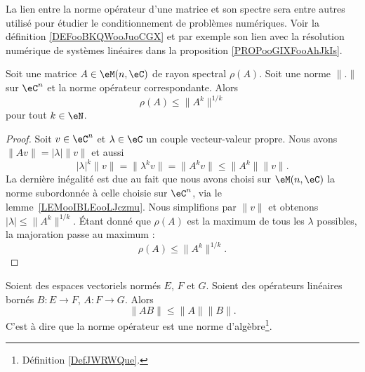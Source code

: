 La lien entre la norme opérateur d'une matrice et son spectre sera entre autres utilisé pour étudier le conditionnement de problèmes numériques. Voir la définition \ref{DEFooBKQWooJuoCGX} et par exemple son lien avec la résolution numérique de systèmes linéaires dans la proposition \ref{PROPooGIXFooAhJkIs}.

\begin{proposition}      \label{PROPooKLFKooSVnDzr}
    Soit une matrice \( A\in \eM(n,\eC)\) de rayon spectral \( \rho(A)\). Soit une norme \( \| . \|\) sur \( \eC^n\) et la norme opérateur correspondante. Alors
    \begin{equation}
        \rho(A)\leq \| A^k \|^{1/k}
    \end{equation}
    pour tout \( k\in \eN\).
\end{proposition}

\begin{proof}
    Soit \( v\in \eC^n\) et \( \lambda\in \eC\) un couple vecteur-valeur propre. Nous avons \( \| Av \|=| \lambda |\| v \|\) et aussi
    \begin{equation}
        | \lambda |^k\| v \|=\| \lambda^kv \|=\| A^kv \|\leq \| A^k \|\| v \|.
    \end{equation}
    La dernière inégalité est due au fait que nous avons choisi sur \( \eM(n,\eC)\) la norme subordonnée à celle choisie sur \( \eC^n\), via le lemme~\ref{LEMooIBLEooLJczmu}. Nous simplifions par \( \| v \|\) et obtenons \( | \lambda |\leq \| A^k \|^{1/k}\). Étant donné que \( \rho(A)\) est la maximum de tous les \( \lambda\) possibles, la majoration passe au maximum :
    \begin{equation}
        \rho(A)\leq \| A^k \|^{1/k}.
    \end{equation}
\end{proof}

\begin{lemma}   \label{LEMooFITMooBBBWGI}
    Soient des espaces vectoriels normés \( E\), \( F\) et \( G\). Soient des opérateurs linéaires bornés \( B\colon E\to F\), \( A\colon F\to G\). Alors
    \begin{equation}
        \| AB \|\leq \| A \|\| B \|.
    \end{equation}
    C'est à dire que la norme opérateur est une norme d'algèbre\footnote{Définition \ref{DefJWRWQue}.}.
\end{lemma}

